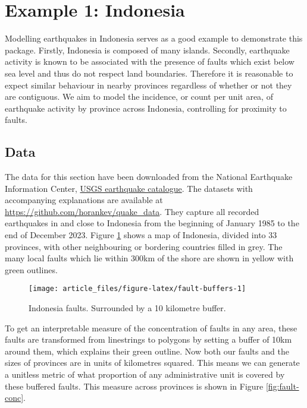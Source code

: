 \hypertarget{example-1-indonesia}{%
\section{Example 1: Indonesia}\label{example-1-indonesia}}

Modelling earthquakes in Indonesia serves as a good example to
demonstrate this package. Firstly, Indonesia is composed of many
islands. Secondly, earthquake activity is known to be associated with
the presence of faults which exist below sea level and thus do not
respect land boundaries. Therefore it is reasonable to expect similar
behaviour in nearby provinces regardless of whether or not they are
contiguous. We aim to model the incidence, or count per unit area, of earthquake activity by
province across Indonesia, controlling for proximity to faults.

\hypertarget{data}{%
\subsection{Data}\label{data}}

The data for this section have been downloaded from the National Earthquake Information Center, \href{https://earthquake.usgs.gov/earthquakes/search/}{USGS earthquake
catalogue}. The
datasets with accompanying explanations are available at
\url{https://github.com/horankev/quake_data}. They capture all recorded earthquakes in
and close to Indonesia from the beginning of January 1985 to the end of December 2023. Figure \ref{fig:fault-buffers} shows a map of Indonesia, divided into 33 provinces, with other neighbouring or bordering countries filled in grey. The many local
faults which lie within 300km of the shore are shown in yellow with green outlines.

\begin{figure}

{\centering \texttt{[image: article\_files/figure-latex/fault-buffers-1]} 

}

\caption{Indonesia faults. Surrounded by a 10 kilometre buffer. }\label{fig:fault-buffers}
\end{figure}

To get an interpretable measure of the concentration of faults in any area,
these faults are transformed from linestrings to polygons by setting a buffer of
10km around them, which explains their green outline. Now both our faults and the sizes of provinces are in units of kilometres
squared. This means we can generate a unitless metric of what proportion of any administrative unit
is covered by these buffered faults. This measure across provinces is shown in Figure
\ref{fig:fault-conc}.

